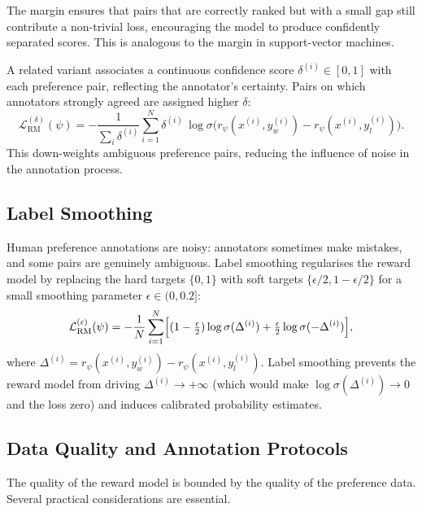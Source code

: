 The margin ensures that pairs that are correctly ranked but with a small gap still contribute a non-trivial loss, encouraging the model to produce confidently separated scores. This is analogous to the margin in support-vector machines.

A related variant associates a continuous confidence score $\delta^{(i)} \in [0, 1]$ with each preference pair, reflecting the annotator's certainty. Pairs on which annotators strongly agreed are assigned higher $\delta$:
\begin{equation}
\label{eq:rm-weighted-loss}
\mathcal{L}_{\mathrm{RM}}^{(\delta)}(\psi)
= -\frac{1}{\sum_i \delta^{(i)}}\sum_{i=1}^{N}
\delta^{(i)}\,\log \sigma\!\bigl(r_\psi(x^{(i)}, y_w^{(i)}) - r_\psi(x^{(i)}, y_l^{(i)})\bigr).
\end{equation}
This down-weights ambiguous preference pairs, reducing the influence of noise in the annotation process.

\subsection{Label Smoothing}

Human preference annotations are noisy: annotators sometimes make mistakes, and some pairs are genuinely ambiguous. Label smoothing regularises the reward model by replacing the hard targets $\{0,1\}$ with soft targets $\{\epsilon/2, 1 - \epsilon/2\}$ for a small smoothing parameter $\epsilon \in (0, 0.2]$:
\begin{equation}
\label{eq:rm-label-smooth}
\mathcal{L}_{\mathrm{RM}}^{(\epsilon)}(\psi)
= -\frac{1}{N}\sum_{i=1}^{N}
\Bigl[(1-\tfrac{\epsilon}{2})\log\sigma(\Delta^{(i)}) + \tfrac{\epsilon}{2}\log\sigma(-\Delta^{(i)})\Bigr],
\end{equation}
where $\Delta^{(i)} = r_\psi(x^{(i)}, y_w^{(i)}) - r_\psi(x^{(i)}, y_l^{(i)})$. Label smoothing prevents the reward model from driving $\Delta^{(i)} \to +\infty$ (which would make $\log\sigma(\Delta^{(i)}) \to 0$ and the loss zero) and induces calibrated probability estimates.

\subsection{Data Quality and Annotation Protocols}

The quality of the reward model is bounded by the quality of the preference data. Several practical considerations are essential.


